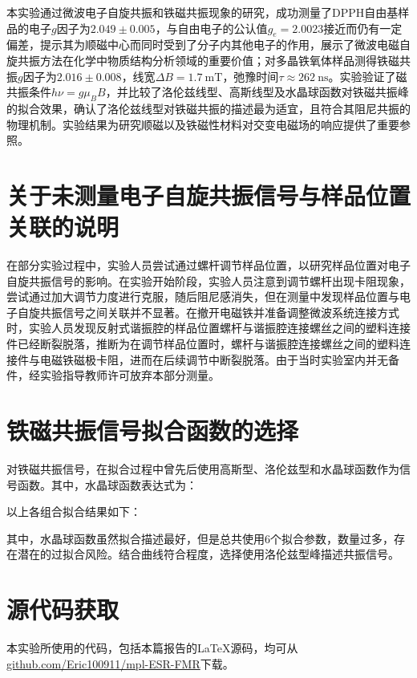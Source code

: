 \documentclass{thuemp}
\begin{document}
    本实验通过微波电子自旋共振和铁磁共振现象的研究，成功测量了DPPH自由基样品的电子$g$因子为$2.049 \pm 0.005$，与自由电子的公认值$g_e=2.0023$接近而仍有一定偏差，提示其为顺磁中心而同时受到了分子内其他电子的作用，展示了微波电磁自旋共振方法在化学中物质结构分析领域的重要价值；对多晶铁氧体样品测得铁磁共振$g$因子为$2.016 \pm 0.008$，线宽$\Delta B = \SI{1.7}{\milli\tesla}$，弛豫时间$\tau \approx \SI{262}{\nano\second}$。实验验证了磁共振条件$h\nu = g\mu_B B$，并比较了洛伦兹线型、高斯线型及水晶球函数对铁磁共振峰的拟合效果，确认了洛伦兹线型对铁磁共振的描述最为适宜，且符合其阻尼共振的物理机制。实验结果为研究顺磁以及铁磁性材料对交变电磁场的响应提供了重要参照。
    
    
    
    \renewcommand\refname{\heiti\wuhao\centerline{参考文献}\global\def\refname{参考文献}}
    \vskip 12pt
    
    \let\OLDthebibliography\thebibliography
    \renewcommand\thebibliography[1]{
      \OLDthebibliography{#1}
      \setlength{\parskip}{0pt}
      \setlength{\itemsep}{0pt plus 0.3ex}
    }
    
    {
    \renewcommand{\baselinestretch}{0.9}
    \liuhao
    

}
\newpage
\appendix

\section{关于未测量电子自旋共振信号与样品位置关联的说明}

在部分实验过程中，实验人员尝试通过螺杆调节样品位置，以研究样品位置对电子自旋共振信号的影响。在实验开始阶段，实验人员注意到调节螺杆出现卡阻现象，尝试通过加大调节力度进行克服，随后阻尼感消失，但在测量中发现样品位置与电子自旋共振信号之间关联并不显著。在撤开电磁铁并准备调整微波系统连接方式时，实验人员发现反射式谐振腔的样品位置螺杆与谐振腔连接螺丝之间的塑料连接件已经断裂脱落，推断为在调节样品位置时，螺杆与谐振腔连接螺丝之间的塑料连接件与电磁铁磁极卡阻，进而在后续调节中断裂脱落。由于当时实验室内并无备件，经实验指导教师许可放弃本部分测量。

\section{铁磁共振信号拟合函数的选择}

对铁磁共振信号，在拟合过程中曾先后使用高斯型、洛伦兹型和水晶球函数作为信号函数。其中，水晶球函数表达式为：


以上各组合拟合结果如下：


其中，水晶球函数虽然拟合描述最好，但是总共使用6个拟合参数，数量过多，存在潜在的过拟合风险。结合曲线符合程度，选择使用洛伦兹型峰描述共振信号。



\section{源代码获取}

本实验所使用的代码，包括本篇报告的\LaTeX 源码，均可从\url{github.com/Eric100911/mpl-ESR-FMR}下载。
\end{document}
